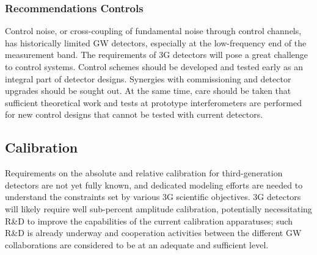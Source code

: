 \subsubsection{Recommendations Controls}
Control noise, or cross-coupling of fundamental noise through control channels, has historically limited GW detectors, especially at the low-frequency end of the measurement band. The requirements of 3G detectors will pose a great challenge to control systems. Control schemes should be developed and tested early as an integral part of detector designs. Synergies with commissioning and detector upgrades should be sought out. At the same time, care should be taken that sufficient theoretical work and tests at prototype interferometers are performed for new control designs that cannot be tested with current detectors.

\subsection{Calibration}

Requirements on the absolute and relative calibration for third-generation detectors are not yet fully known, and dedicated modeling efforts are needed to understand the constraints set by various 3G scientific objectives. 3G detectors will likely require well sub-percent amplitude calibration, potentially necessitating R\&D to improve the capabilities of the current calibration apparatuses; such R\&D is already underway and cooperation activities between the different GW collaborations are considered to be at an adequate and sufficient level. 

